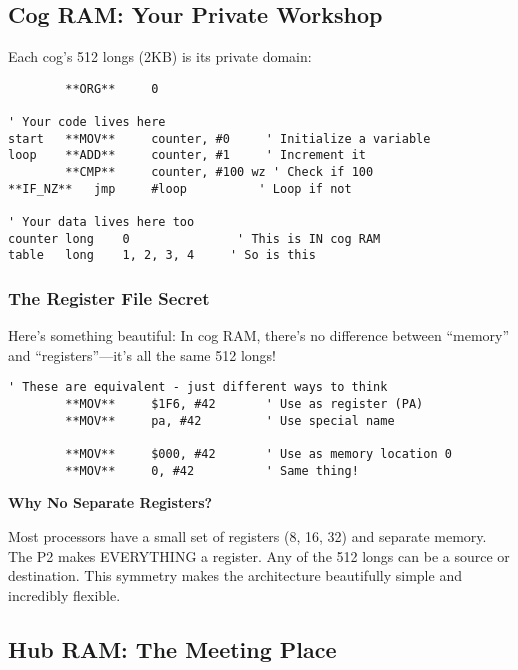 \documentclass[11pt]{book}
\begin{document}
\hypertarget{cog-ram-your-private-workshop}{%
\subsection{Cog RAM: Your Private
Workshop}\label{cog-ram-your-private-workshop}}

Each cog's 512 longs (2KB) is its private domain:

\begin{lstlisting}
        **ORG**     0
        
' Your code lives here
start   **MOV**     counter, #0     ' Initialize a variable
loop    **ADD**     counter, #1     ' Increment it
        **CMP**     counter, #100 wz ' Check if 100
**IF_NZ**   jmp     #loop          ' Loop if not
        
' Your data lives here too
counter long    0               ' This is IN cog RAM
table   long    1, 2, 3, 4     ' So is this
\end{lstlisting}

\hypertarget{the-register-file-secret}{%
\subsubsection{The Register File
Secret}\label{the-register-file-secret}}

Here's something beautiful: In cog RAM, there's no difference between
``memory'' and ``registers''---it's all the same 512 longs!

\begin{lstlisting}
' These are equivalent - just different ways to think
        **MOV**     $1F6, #42       ' Use as register (PA)
        **MOV**     pa, #42         ' Use special name
        
        **MOV**     $000, #42       ' Use as memory location 0
        **MOV**     0, #42          ' Same thing!
\end{lstlisting}

\begin{sidetrack}
\textbf{Why No Separate Registers?}

Most processors have a small set of registers (8, 16, 32) and separate memory. The P2 makes EVERYTHING a register. Any of the 512 longs can be a source or destination. This symmetry makes the architecture beautifully simple and incredibly flexible.
\end{sidetrack}

\hypertarget{hub-ram-the-meeting-place}{%
\subsection{Hub RAM: The Meeting
Place}\label{hub-ram-the-meeting-place}}
\end{document}
